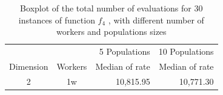 \documentclass[review]{elsarticle}
\begin{document}
%
%
\begin{table}[h!tbp]
    \small
    \caption{Boxplot of the total number of evaluations for 30 instances of function $f_4$ , with different number of workers and populations sizes }

    \label{tab:medians:rate}
    \vspace{0.25cm}
    \centering

    \begin{tabular}{ccrr}
    \hline
               &         & 5 Populations    & 10 Populations \\
     Dimension & Workers & Median of rate & Median of rate  \\
    \hline
    2         & 1w      & 10,815.95      & 10,771.30      \\
    

\end{tabular}
\end{table}
\end{document}
